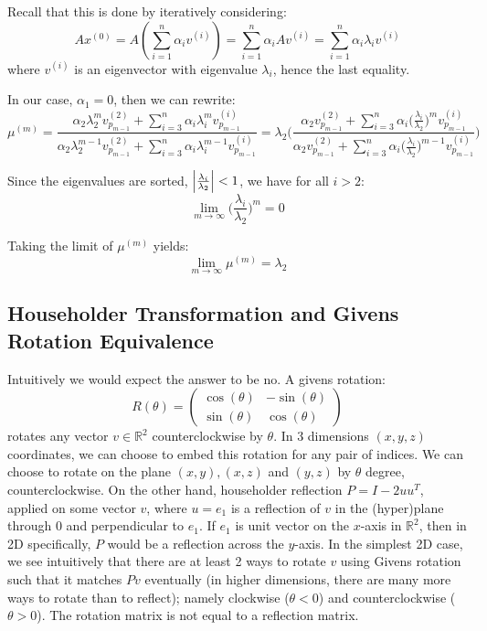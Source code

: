 \documentclass[12pt]{article} %
\newcommand{\rr}{\mathbb{R}}
\newcommand{\ntoinf}[1]{\lim_{{#1}\rightarrow \infty}}
\newcommand{\1}[1]{\mathds{1}\left[#1\right]}
\begin{document}
Recall that this is done by iteratively considering:
$$
	Ax^{(0)} = A(\sum_{i=1}^n\alpha_iv^{(i)}) = \sum_{i=1}^n\alpha_iAv^{(i)} = \sum_{i=1}^n\alpha_i\lambda_iv^{(i)}
$$ where $v^{(i)}$ is an eigenvector with eigenvalue $\lambda_i$, hence the last equality.

In our case, $\alpha_1 = 0$, then we can rewrite:
$$
	\mu^{(m)} = \frac{\alpha_2\lambda_2^mv_{p_{m-1}}^{(2)}+\sum_{i=3}^n \alpha_i\lambda_i^mv_{p_{m-1}}^{(i)}}{\alpha_2\lambda_2^{m-1}v_{p_{m-1}}^{(2)}+\sum_{i=3}^n \alpha_i\lambda_i^{m-1}v_{p_{m-1}}^{(i)}} = \lambda_2\bigg(
	\frac{\alpha_2v_{p_{m-1}}^{(2)} + \sum_{i=3}^n\alpha_i\big(\frac{\lambda_i}{\lambda_2}\big)^{m}v_{p_{m-1}}^{(i)}}{\alpha_2v_{p_{m-1}}^{(2)} + \sum_{i=3}^n\alpha_i\big(\frac{\lambda_i}{\lambda_2}\big)^{m-1}v_{p_{m-1}}^{(i)}}
	\bigg)
$$

Since the eigenvalues are sorted, $\abs{\frac{\lambda_i}{\lambda_2}} < 1$, we have for all $i > 2$:
$$
	\ntoinf{m}\bigg(
	\frac{\lambda_i}{\lambda_2}
	\bigg)^m = 0
$$

Taking the limit of $\mu^{(m)}$ yields:
$$
	\ntoinf{m}\mu^{(m)} = \lambda_2
$$

\newpage
\subsection{Householder Transformation and Givens Rotation Equivalence}
Intuitively we would expect the answer to be no. A givens rotation:
$$
	R(\theta) = 
	\begin{pmatrix}
		\cos(\theta) & -\sin(\theta)\\
		\sin(\theta) & \cos(\theta)
	\end{pmatrix}
$$ rotates any vector $v\in \rr^2$ counterclockwise by $\theta$. In 3 dimensions $(x,y,z)$ coordinates, we can choose to embed this rotation for any pair of indices. We can choose to rotate on the plane $(x,y),(x,z)$ and $(y,z)$ by $\theta$ degree, counterclockwise. On the other hand, householder reflection $P = I - 2uu^T$, applied on some vector $v$, where $u = e_1$ is a reflection of $v$ in the (hyper)plane through 0 and perpendicular to $e_1$. If $e_1$ is unit vector on the $x$-axis in $\rr^2$, then in 2D specifically, $P$ would be a reflection across the $y$-axis. In the simplest 2D case, we see intuitively that there are at least 2 ways to rotate $v$ using Givens rotation such that it matches $Pv$ eventually (in higher dimensions, there are many more ways to rotate than to reflect); namely clockwise ($\theta<0$) and counterclockwise ($\theta>0$). The  rotation matrix is not equal to a reflection matrix.
\end{document}
